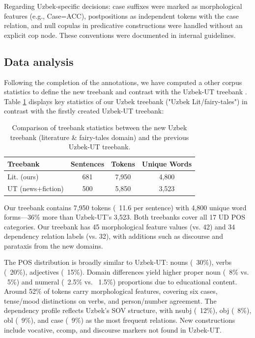 \documentclass[10pt,conference,a4paper]{IEEEtran_EDM}
\begin{document}
Regarding Uzbek-specific decisions: case suffixes were marked as morphological features (e.g., Case=ACC), postpositions as independent tokens with the case relation, and null copulas in predicative constructions were handled without an explicit cop node. These conventions were documented in internal guidelines.

\subsection{Data analysis} Following the completion of the annotations, we have computed a other corpus statistics to define the new treebank and contrast with the Uzbek-UT treebank \cite{Akhundjanova-Talamo}. Table \ref{tab:uzbek_treebank_comparison} displays key statistics of our Uzbek treebank ("Uzbek Lit/fairy-tales") in contrast with the firstly created Uzbek-UT treebank:
\begin{table}[ht]
\caption{Comparison of treebank statistics between the new Uzbek treebank 
(literature \& fairy-tales domain) and the previous Uzbek-UT treebank.}
\begin{center}
\begin{tabular}{lccc}
\hline
\textbf{Treebank} & \textbf{Sentences} & \textbf{Tokens} & \textbf{Unique Words}\\
\hline
Lit. (ours)     & 681 & 7,950 & 4,800 \\
UT (news+fiction)  & 500 & 5,850 & 3,523\\
\hline
\end{tabular}
\label{tab:uzbek_treebank_comparison}
\end{center}
\end{table}
Our treebank contains 7,950 tokens (~11.6 per sentence) with 4,800 unique word forms---36\% more than Uzbek-UT's 3,523. Both treebanks cover all 17 UD POS categories. Our treebank has 45 morphological feature values (vs. 42) and 34 dependency relation labels (vs. 32), with additions such as discourse and parataxis from the new domains.

The POS distribution is broadly similar to Uzbek-UT: nouns (~30\%), verbs (~20\%), adjectives (~15\%). Domain differences yield higher proper noun (~8\% vs. ~5\%) and numeral (~2.5\% vs. ~1.5\%) proportions due to educational content. Around 52\% of tokens carry morphological features, covering six cases, tense/mood distinctions on verbs, and person/number agreement. The dependency profile reflects Uzbek's SOV\cite{10.1007/978-3-031-05328-3_6} structure, with nsubj (~12\%), obj (~8\%), obl (~9\%), and case (~9\%) as the most frequent relations. New constructions include vocative, ccomp, and discourse markers not found in Uzbek-UT.
\end{document}
